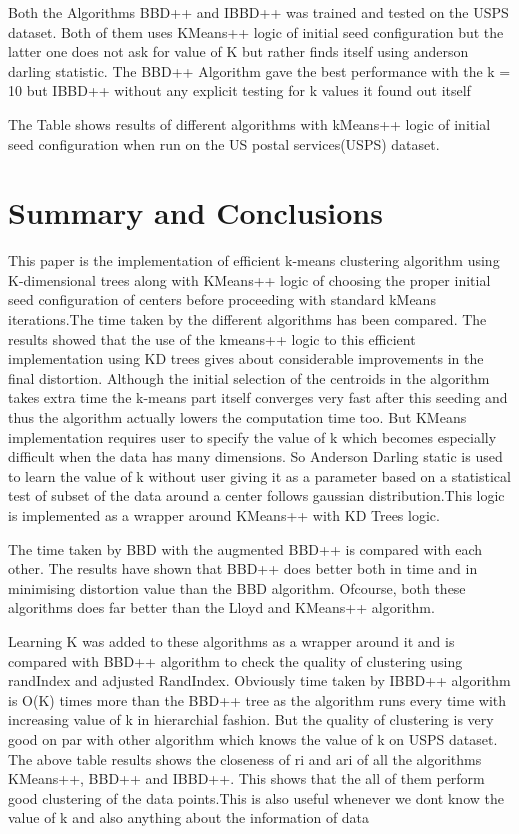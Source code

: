 \documentclass[conference]{IEEEtran}
\begin{document}
Both the Algorithms BBD++ and IBBD++ was trained and tested on the USPS dataset. Both of them uses KMeans++ logic of initial seed configuration but the latter one does not ask for value of K but rather finds itself using anderson darling statistic. The BBD++ Algorithm gave the best performance with the k = 10 but IBBD++ without any explicit testing for k values it found out itself

The Table \pageref{table:3} shows results of different algorithms with kMeans++ logic of initial seed configuration when run on the US postal services(USPS) dataset.  


\section{Summary and Conclusions}

This paper is the implementation of efficient k-means clustering algorithm using K-dimensional trees along with KMeans++ logic of choosing the proper initial seed configuration of centers before proceeding with standard kMeans iterations.The time taken by the different algorithms has been compared. The results showed that the use of the kmeans++ logic to this efficient implementation using KD trees gives about considerable improvements in the final distortion. Although the initial selection of the centroids in the algorithm takes extra time the k-means part itself converges very fast after this seeding and thus the algorithm actually lowers the computation time too. But KMeans implementation requires user to specify the value of k which becomes especially difficult when the data has many dimensions. So Anderson Darling static is used to learn the value of k without user giving it as a parameter based on a statistical test of subset of the data around a center follows gaussian distribution.This logic is implemented as a wrapper around KMeans++ with KD Trees logic.

The time taken by BBD with the augmented BBD++ is compared with each other. The results have shown that BBD++ does better both in time and in minimising distortion value than the BBD algorithm. Ofcourse, both these algorithms does far better than the Lloyd and KMeans++ algorithm. 

Learning K was added to these algorithms as a wrapper around it and is compared with BBD++ algorithm to check the quality of clustering using randIndex and adjusted RandIndex. Obviously time taken by IBBD++ algorithm is O(K) times more than the BBD++ tree as the algorithm runs every time with increasing value of k in hierarchial fashion. But the quality of clustering is very good on par with other algorithm which knows the value of k on USPS dataset. The above table results shows the closeness of ri and ari of all the algorithms KMeans++, BBD++ and IBBD++. This shows that the all of them perform good clustering of the data points.This is also useful whenever we dont know the value of k and also anything about the information of data
\end{document}
